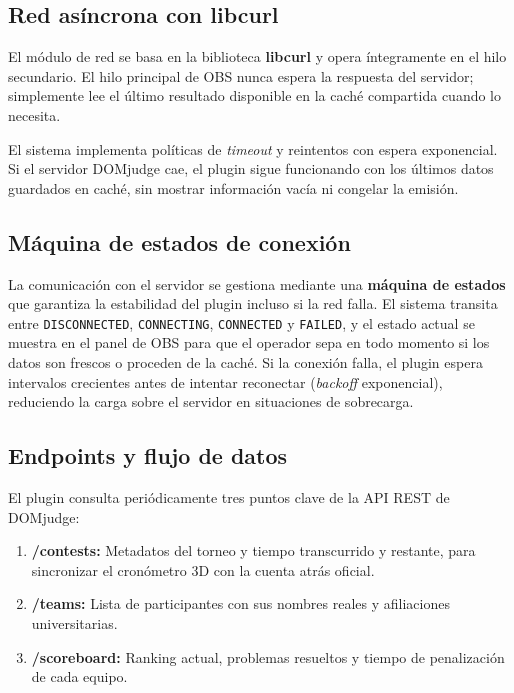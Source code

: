  
\subsection{Red asíncrona con libcurl}
\label{subsec:libcurl}
 
El módulo de red se basa en la biblioteca \textbf{libcurl} y opera íntegramente en el hilo
secundario. El hilo principal de OBS nunca espera la respuesta del servidor; simplemente lee el
último resultado disponible en la caché compartida cuando lo necesita.
 
El sistema implementa políticas de \textit{timeout} y reintentos con espera exponencial. Si el
servidor DOMjudge cae, el plugin sigue funcionando con los últimos datos guardados en caché, sin
mostrar información vacía ni congelar la emisión.
 
 
\subsection{Máquina de estados de conexión}
\label{subsec:estados_conexion}
 
La comunicación con el servidor se gestiona mediante una \textbf{máquina de estados} que
garantiza la estabilidad del plugin incluso si la red falla. El sistema transita entre
\texttt{DISCONNECTED}, \texttt{CONNECTING}, \texttt{CONNECTED} y \texttt{FAILED}, y el estado
actual se muestra en el panel de OBS para que el operador sepa en todo momento si los datos son
frescos o proceden de la caché. Si la conexión falla, el plugin espera intervalos crecientes
antes de intentar reconectar (\textit{backoff} exponencial), reduciendo la carga sobre el
servidor en situaciones de sobrecarga.
 
 
\subsection{Endpoints y flujo de datos}
\label{subsec:endpoints}
 
El plugin consulta periódicamente tres puntos clave de la API REST de DOMjudge:
 
\begin{enumerate}
    \item \textbf{/contests:} Metadatos del torneo y tiempo transcurrido y restante, para
    sincronizar el cronómetro 3D con la cuenta atrás oficial.
    \item \textbf{/teams:} Lista de participantes con sus nombres reales y afiliaciones
    universitarias.
    \item \textbf{/scoreboard:} Ranking actual, problemas resueltos y tiempo de penalización de
    cada equipo.
\end{enumerate}
 
